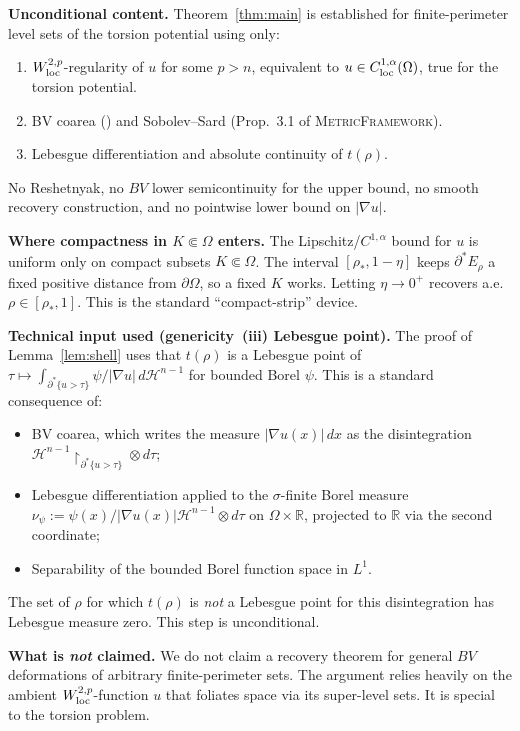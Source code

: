 \documentclass[11pt]{article}
\theoremstyle{definition}
\newcommand{\R}{\mathbb{R}}
\newcommand{\Om}{\Omega}
\newcommand{\rstar}{\rho_{*}}
\newcommand{\Hn}{\mathcal H^{n-1}}
\begin{document}
\textbf{Unconditional content.}
Theorem~\ref{thm:main} is established for finite-perimeter level sets of
the torsion potential using only:
\begin{enumerate}[label=(\arabic*)]
\item $W^{2,p}_{\rm loc}$-regularity of $u$ for some $p>n$, equivalent to
$u\in C^{1,\alpha}_{\rm loc}(\Om)$, true for the torsion potential.
\item BV coarea (\cite[Thm.~13.1]{Maggi2012}) and Sobolev--Sard (Prop.~3.1
of \textsc{MetricFramework}).
\item Lebesgue differentiation and absolute continuity of $t(\rho)$.
\end{enumerate}
No Reshetnyak, no $BV$ lower semicontinuity for the upper bound, no smooth
recovery construction, and no pointwise lower bound on $|\nabla u|$.

\smallskip
\textbf{Where compactness in $K\Subset\Om$ enters.}
The Lipschitz/$C^{1,\alpha}$ bound for $u$ is uniform only on compact
subsets $K\Subset\Om$. The interval $[\rstar,1-\eta]$ keeps
$\partial^*E_\rho$ a fixed positive distance from $\partial\Om$, so a fixed
$K$ works. Letting $\eta\to0^+$ recovers a.e.\ $\rho\in[\rstar,1]$. This is
the standard ``compact-strip'' device.

\smallskip
\textbf{Technical input used (genericity~(iii) Lebesgue point).}
The proof of Lemma~\ref{lem:shell} uses that $t(\rho)$ is a Lebesgue point
of $\tau\mapsto\int_{\partial^*\{u>\tau\}}\psi/|\nabla u|\,d\Hn$ for
bounded Borel $\psi$. This is a standard consequence of:
\begin{itemize}
\item BV coarea, which writes the measure $|\nabla u(x)|\,dx$ as the
disintegration $\Hn\!\!\restriction_{\partial^*\{u>\tau\}}\otimes d\tau$;
\item Lebesgue differentiation applied to the
$\sigma$-finite Borel measure $\nu_\psi:=\psi(x)/|\nabla u(x)|\Hn\otimes d\tau$
on $\Om\times\R$, projected to $\R$ via the second coordinate;
\item Separability of the bounded Borel function space in $L^1$.
\end{itemize}
The set of $\rho$ for which $t(\rho)$ is \emph{not} a Lebesgue point for
this disintegration has Lebesgue measure zero. This step is unconditional.

\smallskip
\textbf{What is \emph{not} claimed.}
We do not claim a recovery theorem for general $BV$ deformations of
arbitrary finite-perimeter sets. The argument relies heavily on the
ambient $W^{2,p}_{\rm loc}$-function $u$ that foliates space via its
super-level sets. It is special to the torsion problem.
\end{document}
